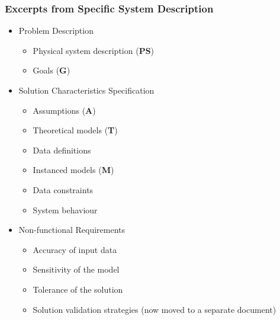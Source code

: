 \documentclass[t,12pt,numbers,fleqn]{beamer}
\begin{document}

\begin{frame}
\frametitle{Excerpts from Specific System Description}

\begin{itemize}

\item Problem Description
\begin{itemize}
\item Physical system description (\textbf{PS}) 
\item Goals (\textbf{G})
\end{itemize}
 
\item Solution Characteristics Specification
\begin{itemize}
\item Assumptions (\textbf{A})
\item Theoretical models (\textbf{T})
\item Data definitions
\item Instanced models (\textbf{M})
\item Data constraints
\item System behaviour
\end{itemize}

\item Non-functional Requirements
\begin{itemize}
\item Accuracy of input data
\item Sensitivity of the model
\item Tolerance of the solution
\item Solution validation strategies (now moved to a separate document)
\end{itemize}

\end{itemize}

\end{frame}

\end{document}
